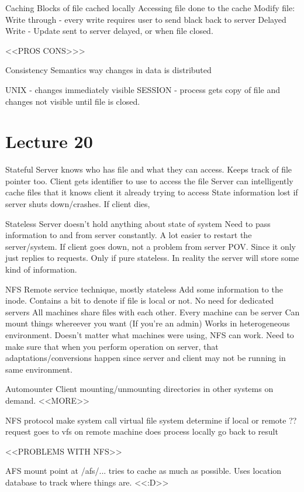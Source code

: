 \documentclass{article}
\begin{document}
	Caching
		Blocks of file cached locally
		Accessing file done to the cache
		Modify file:
			Write through - every write requires user to send black back to server
			Delayed Write - Update sent to server delayed, or when file closed.

		<<PROS CONS>>>

	Consistency Semantics
		way changes in data is distributed

		UNIX - changes immediately visible
		SESSION - process gets copy of file and changes not visible until file is closed.
	
\section{Lecture 20}
	Stateful
		Server knows who has file and what they can access. Keeps track of file pointer too.
		Client gets identifier to use to access the file
		Server can intelligently cache files that it knows client it already trying to access
		State information lost if server shuts down/crashes.
		If client dies, 

	Stateless
		Server doesn't hold anything about state of system
		Need to pass information to and from server constantly.
		A lot easier to restart the server/system.
		If client goes down, not a problem from server POV. Since it only just replies to requests.
			Only if pure stateless. In reality the server will store some kind of information.

	NFS
		Remote service technique, mostly stateless
		Add some information to the inode. Contains a bit to denote if file is local or not.
		No need for dedicated servers
		All machines share files with each other. Every machine can be server
		Can mount things whereever you want (If you're an admin)
		Works in heterogeneous environment. Doesn't matter what machines were using, NFS can work.
		Need to make sure that when you perform operation on server, that adaptations/conversions happen since server and client may not be running in same environment.

	Automounter
		Client mounting/unmounting directories in other systems on demand.
		<<MORE>>

	NFS protocol
		make system call
		virtual file system determine if local or remote
		??
		request goes to vfs on remote machine
		does process locally
		go back to result

	<<PROBLEMS WITH NFS>>

	AFS
		mount point at /afs/...
		tries to cache as much as possible.
		Uses location database to track where things are.
		<<:D>>
\end{document}
